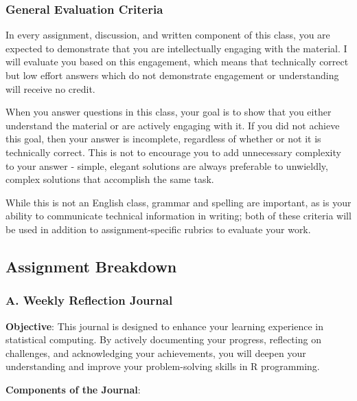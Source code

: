 \documentclass[
  11pt,
  letterpaper,
  DIV=11,
  numbers=noendperiod]{scrartcl}
\begin{document}
\hypertarget{general-evaluation-criteria}{%
\subsubsection{General Evaluation
Criteria}\label{general-evaluation-criteria}}

In every assignment, discussion, and written component of this class,
you are expected to demonstrate that you are intellectually engaging
with the material. I will evaluate you based on this engagement, which
means that technically correct but low effort answers which do not
demonstrate engagement or understanding will receive no credit.

When you answer questions in this class, your goal is to show that you
either understand the material or are actively engaging with it. If you
did not achieve this goal, then your answer is incomplete, regardless of
whether or not it is technically correct. This is not to encourage you
to add unnecessary complexity to your answer - simple, elegant solutions
are always preferable to unwieldly, complex solutions that accomplish
the same task.

While this is not an English class, grammar and spelling are important,
as is your ability to communicate technical information in writing; both
of these criteria will be used in addition to assignment-specific
rubrics to evaluate your work.

\hypertarget{assignment-breakdown}{%
\subsection{Assignment Breakdown}\label{assignment-breakdown}}

\hypertarget{a.-weekly-reflection-journal}{%
\subsubsection{A. Weekly Reflection
Journal}\label{a.-weekly-reflection-journal}}

\textbf{Objective}: This journal is designed to enhance your learning
experience in statistical computing. By actively documenting your
progress, reflecting on challenges, and acknowledging your achievements,
you will deepen your understanding and improve your problem-solving
skills in R programming.

\textbf{Components of the Journal}:
\end{document}
